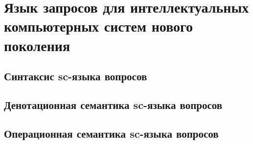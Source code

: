 \chapter{Язык запросов для интеллектуальных компьютерных систем нового поколения}
\label{chapter_requests}


\section{Синтаксис sc-языка вопросов}
\section{Денотационная семантика sc-языка вопросов}
\section{Операционная семантика sc-языка вопросов}

%